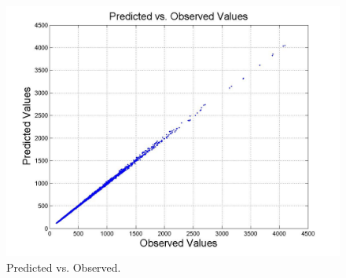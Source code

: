 %
%
\begin{figure}
    \centering
        \includegraphics[width=0.65\linewidth]{figRunBigPredictedvsObserved3.jpg}
      \caption{Predicted vs. Observed.}
      \label{Fig:EstimatedvsSimulated}
\end{figure}

